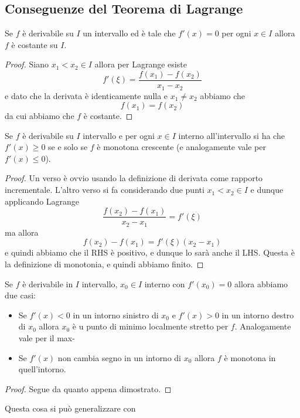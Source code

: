 \documentclass[11pt]{scrartcl}
\begin{document}
	\subsection{Conseguenze del Teorema di Lagrange}
	\begin{proposition}[Primitiva di $0$]
		Se $f$ è derivabile su $I$ un intervallo ed è tale che $f'(x)=0$ per ogni $x\in I$ allora 
		$f$ è costante su $I$.
	\end{proposition}
	\begin{proof}
		Siano $x_1<x_2\in I$ allora per Lagrange esiste
		$$f'(\xi)=\frac{f(x_1)-f(x_2)}{x_1-x_2}$$
		e dato che la derivata è identicamente nulla e $x_1\ne x_2$ abbiamo che 
		$$f(x_1)=f(x_2)$$
		da cui abbiamo che $f$ è costante.
	\end{proof}
	\begin{proposition}
		Se $f$ è derivabile su $I$ intervallo e per ogni $x\in I$ interno all'intervallo si ha che  $f'(x)\ge 0$ se e solo se $f$ è monotona crescente (e analogamente vale per $f'(x)\le 0$).
	\end{proposition}
	\begin{proof}
		Un verso è ovvio usando la definizione di derivata come rapporto incrementale. L'altro verso si fa considerando due punti $x_1<x_2\in I$ e dunque applicando Lagrange
		$$\frac{f(x_2)-f(x_1)}{x_2-x_1}=f'(\xi)$$
		ma allora
		$$f(x_2)-f(x_1)=f'(\xi)(x_2-x_1)$$
		e quindi abbiamo che il RHS è positivo, e dunque lo sarà anche il LHS. Questa è la definizione di monotonia, e quindi abbiamo finito.
	\end{proof}
	\begin{proposition}
		Se $f$ è derivabile in $I$ intervallo, $x_0\in I$ interno con $f'(x_0)=0$ allora abbiamo due casi:
		\begin{itemize}
			\item Se $f'(x)<0$ in un intorno sinistro di $x_0$ e $f'(x)>0$ in un intorno destro di $x_0$ allora $x_0$ è u punto di minimo localmente stretto per $f$. Analogamente vale per il max-
			\item Se $f'(x)$ non cambia segno in un intorno di $x_0$ allora $f$ è monotona in quell'intorno. 
		\end{itemize}
	\end{proposition}
	\begin{proof}
		Segue da quanto appena dimostrato.
	\end{proof}
	Questa cosa si può generalizzare con
\end{document}
